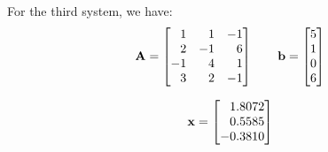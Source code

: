 For the third system, we have:
\begin{equation*}
  \mathbf{A} = \begin{bmatrix}
    \phantom{-}1 & \phantom{-}1 & -1 \\
    \phantom{-}2 & -1 & \phantom{-}6 \\
    -1 & \phantom{-}4 & \phantom{-}1 \\
    \phantom{-}3 & \phantom{-}2 & -1
  \end{bmatrix} \qquad
  \mathbf{b} = \begin{bmatrix}
    5 \\
    1 \\
    0 \\
    6
  \end{bmatrix}
\end{equation*}

\begin{equation*}
  \mathbf{x} = \begin{bmatrix}
    \phantom{-}1.8072 \\
    \phantom{-}0.5585 \\
    -0.3810
  \end{bmatrix}
\end{equation*}

